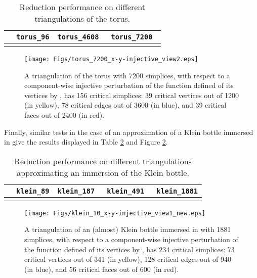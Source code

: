 \documentclass[12pt]{article}
\begin{document}
\begin{table}[h]
\caption{Reduction performance on different triangulations of the torus.}
\begin{center}
\begin{tabular}{| c | c | c | c|}
\hline
 & \tt{torus\_96}&
 \tt{torus\_4608} & \tt{torus\_7200} \\
 \hline
   &
  &
 &

\\
 \hline
 \end{tabular}
 \end{center}
\label{tab:torus}
\end{table}


\begin{figure}[ht]
\begin{center}
\texttt{[image: Figs/torus\_7200\_x-y-injective\_view2.eps]}
  \caption{A triangulation of the torus with 7200 simplices, with respect to a component-wise injective perturbation of the function defined of its vertices by , has 156 critical simplices: 39 critical vertices  out of 1200  (in yellow), 78 critical edges  out of 3600 (in blue),  and 39 critical faces  out of 2400 (in red).
 }
\end{center}
\label{fig:torus}
\end{figure}


Finally, similar tests in the case of an approximation of a Klein bottle immersed in  give the results displayed in Table \ref{tab:klein} and Figure \ref{fig:klein}.

\begin{table}[h]
\caption{Reduction performance on different triangulations approximating an immersion of the Klein bottle.}
\begin{center}
\begin{tabular}{| c | c | c | c| c |}
\hline
 & \tt{klein\_89}&
 \tt{klein\_187} & \tt{klein\_491} &  \tt{klein\_1881}\\
 \hline
   &
  &
 &
 &

\\
 \hline
 \end{tabular}
 \end{center}
\label{tab:klein}
\end{table}


\begin{figure}
\begin{center}
\texttt{[image: Figs/klein\_10\_x-y-injective\_view1\_new.eps]}
  \caption{A triangulation of an (almost) Klein bottle immersed in  with 1881 simplices, with respect to a component-wise injective perturbation of the function defined of its vertices by , has 234 critical simplices: 73 critical vertices  out of 341  (in yellow), 128 critical edges  out of 940 (in blue),  and 56 critical faces  out of 600 (in red).
 }
\end{center}
\label{fig:klein}
\end{figure}
\end{document}
